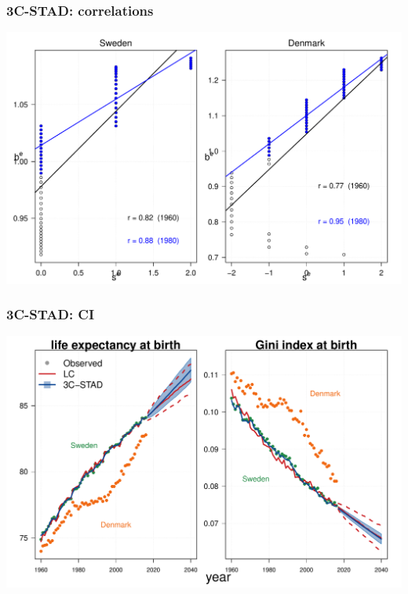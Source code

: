 \documentclass[12pt, xcolor=table]{beamer}  %
\begin{document}

\begin{frame}[noframenumbering]\frametitle{3C-STAD: correlations}

\vspace{-0.5cm}
	
	
	\begin{center}	
		\vspace{0.2cm}
		
		\includegraphics[scale=.42]{Figures/Ch3/F_CORR_EA}
		
	\end{center}
	
\end{frame}

\begin{frame}[noframenumbering]\frametitle{3C-STAD: CI}

\vspace{-0.5cm}
%	
	
	\begin{center}	
		\vspace{0.2cm}
		
		\includegraphics[scale=.42]{Figures/Ch3/F4_a2}
		
	\end{center}
	
\end{frame}
\end{document}
